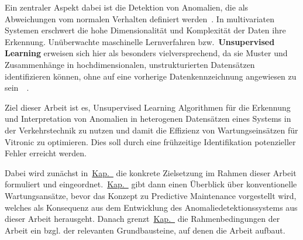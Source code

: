 Ein zentraler Aspekt dabei ist die Detektion von Anomalien, die als Abweichungen vom normalen Verhalten definiert
werden~\cite{Chandola2009}. In multivariaten Systemen erschwert die hohe Dimensionalität und Komplexität der Daten ihre Erkennung.
Unüberwachte maschinelle Lernverfahren bzw.~\textbf{Unsupervised Learning} erweisen sich hier als besonders vielversprechend,
da sie Muster und Zusammenhänge in hochdimensionalen, unstrukturierten Datensätzen identifizieren können, ohne auf eine vorherige
Datenkennzeichnung angewiesen zu sein~\cite{Chandola2009}~\cite[S.~22--24]{Wenig2024}.

Ziel dieser Arbeit ist es, Unsupervised Learning Algorithmen für die Erkennung und Interpretation von Anomalien in
heterogenen Datensätzen eines Systems in der Verkehrstechnik zu nutzen und damit die Effizienz von Wartungseinsätzen für
Vitronic zu optimieren. Dies soll durch eine frühzeitige Identifikation potenzieller Fehler erreicht werden.

Dabei wird zunächst in~\hyperref[ch:zielsetzung]{Kap.~} die konkrete Zielsetzung im Rahmen dieser Arbeit formuliert
und eingeordnet.~\hyperref[ch:pdm_theorie]{Kap.~} gibt dann einen Überblick über konventionelle Wartungsansätze,
bevor das Konzept zu Predictive Maintenance vorgestellt wird, welches als Konsequenz aus dem Entwicklung des Anomaliedetektionssystems
aus dieser Arbeit herausgeht. Danach grenzt~\hyperref[ch:pdm_theorie]{Kap.~} die Rahmenbedingungen der Arbeit ein bzgl.
der relevanten Grundbausteine, auf denen die Arbeit aufbaut.
